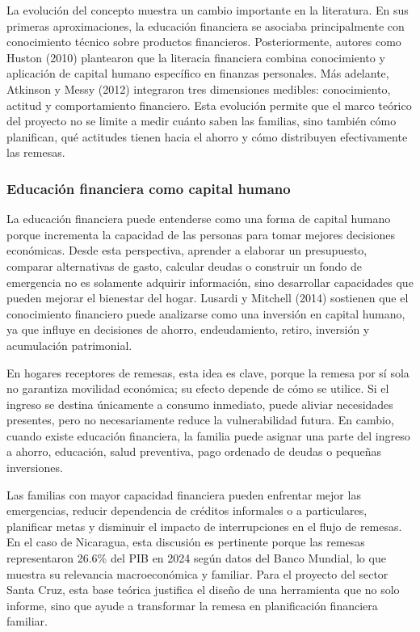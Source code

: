 \documentclass[12pt,letterpaper]{article}
\begin{document}
La evolución del concepto muestra un cambio importante en la literatura. En sus primeras aproximaciones, la educación financiera se asociaba principalmente con conocimiento técnico sobre productos financieros. Posteriormente, autores como Huston (2010) plantearon que la literacia financiera combina conocimiento y aplicación de capital humano específico en finanzas personales. Más adelante, Atkinson y Messy (2012) integraron tres dimensiones medibles: conocimiento, actitud y comportamiento financiero. Esta evolución permite que el marco teórico del proyecto no se limite a medir cuánto saben las familias, sino también cómo planifican, qué actitudes tienen hacia el ahorro y cómo distribuyen efectivamente las remesas.

\subsubsection{\texorpdfstring{\textbf{Educación financiera como capital humano}}{Educación financiera como capital humano}}\label{educaciuxf3n-financiera-como-capital-humano}

La educación financiera puede entenderse como una forma de capital humano porque incrementa la capacidad de las personas para tomar mejores decisiones económicas. Desde esta perspectiva, aprender a elaborar un presupuesto, comparar alternativas de gasto, calcular deudas o construir un fondo de emergencia no es solamente adquirir información, sino desarrollar capacidades que pueden mejorar el bienestar del hogar. Lusardi y Mitchell (2014) sostienen que el conocimiento financiero puede analizarse como una inversión en capital humano, ya que influye en decisiones de ahorro, endeudamiento, retiro, inversión y acumulación patrimonial.

En hogares receptores de remesas, esta idea es clave, porque la remesa por sí sola no garantiza movilidad económica; su efecto depende de cómo se utilice. Si el ingreso se destina únicamente a consumo inmediato, puede aliviar necesidades presentes, pero no necesariamente reduce la vulnerabilidad futura. En cambio, cuando existe educación financiera, la familia puede asignar una parte del ingreso a ahorro, educación, salud preventiva, pago ordenado de deudas o pequeñas inversiones.

Las familias con mayor capacidad financiera pueden enfrentar mejor las emergencias, reducir dependencia de créditos informales o a particulares, planificar metas y disminuir el impacto de interrupciones en el flujo de remesas. En el caso de Nicaragua, esta discusión es pertinente porque las remesas representaron 26.6\% del PIB en 2024 según datos del Banco Mundial, lo que muestra su relevancia macroeconómica y familiar. Para el proyecto del sector Santa Cruz, esta base teórica justifica el diseño de una herramienta que no solo informe, sino que ayude a transformar la remesa en planificación financiera familiar.
\end{document}
